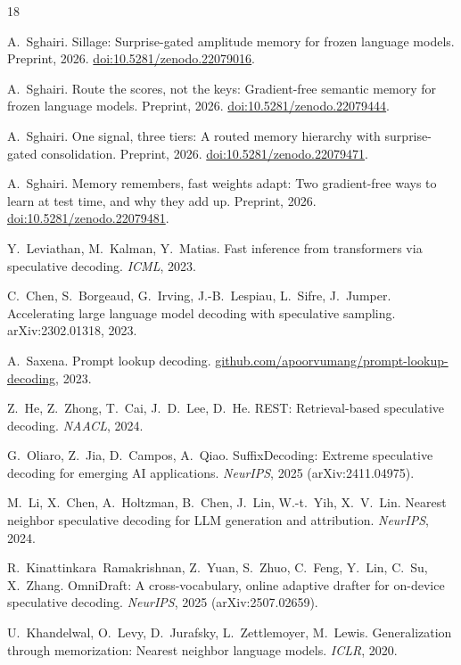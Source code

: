 \documentclass[11pt]{article}
\begin{document}
\begin{thebibliography}{18}\small

 A.~Sghairi. Sillage: Surprise-gated amplitude memory for frozen language models. Preprint, 2026. \href{https://doi.org/10.5281/zenodo.22079016}{doi:10.5281/zenodo.22079016}.

 A.~Sghairi. Route the scores, not the keys: Gradient-free semantic memory for frozen language models. Preprint, 2026. \href{https://doi.org/10.5281/zenodo.22079444}{doi:10.5281/zenodo.22079444}.

 A.~Sghairi. One signal, three tiers: A routed memory hierarchy with surprise-gated consolidation. Preprint, 2026. \href{https://doi.org/10.5281/zenodo.22079471}{doi:10.5281/zenodo.22079471}.

 A.~Sghairi. Memory remembers, fast weights adapt: Two gradient-free ways to learn at test time, and why they add up. Preprint, 2026. \href{https://doi.org/10.5281/zenodo.22079481}{doi:10.5281/zenodo.22079481}.

 Y.~Leviathan, M.~Kalman, Y.~Matias. Fast inference from transformers via speculative decoding. \emph{ICML}, 2023.

 C.~Chen, S.~Borgeaud, G.~Irving, J.-B.~Lespiau, L.~Sifre, J.~Jumper. Accelerating large language model decoding with speculative sampling. arXiv:2302.01318, 2023.

 A.~Saxena. Prompt lookup decoding. \href{https://github.com/apoorvumang/prompt-lookup-decoding}{github.com/apoorvumang/prompt-lookup-decoding}, 2023.

 Z.~He, Z.~Zhong, T.~Cai, J.~D.~Lee, D.~He. REST: Retrieval-based speculative decoding. \emph{NAACL}, 2024.

 G.~Oliaro, Z.~Jia, D.~Campos, A.~Qiao. SuffixDecoding: Extreme speculative decoding for emerging AI applications. \emph{NeurIPS}, 2025 (arXiv:2411.04975).

 M.~Li, X.~Chen, A.~Holtzman, B.~Chen, J.~Lin, W.-t.~Yih, X.~V.~Lin. Nearest neighbor speculative decoding for LLM generation and attribution. \emph{NeurIPS}, 2024.

 R.~Kinattinkara~Ramakrishnan, Z.~Yuan, S.~Zhuo, C.~Feng, Y.~Lin, C.~Su, X.~Zhang. OmniDraft: A cross-vocabulary, online adaptive drafter for on-device speculative decoding. \emph{NeurIPS}, 2025 (arXiv:2507.02659).

 U.~Khandelwal, O.~Levy, D.~Jurafsky, L.~Zettlemoyer, M.~Lewis. Generalization through memorization: Nearest neighbor language models. \emph{ICLR}, 2020.


\end{thebibliography}
\end{document}
